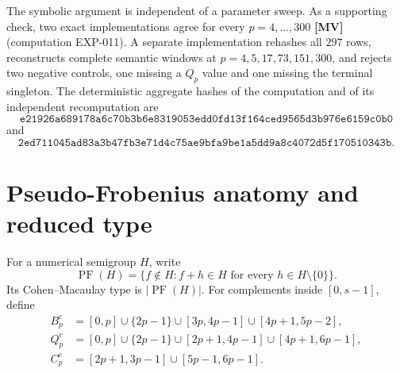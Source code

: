 \documentclass[11pt]{article}
\theoremstyle{definition}
\theoremstyle{remark}
\begin{document}
The symbolic argument is independent of a parameter sweep. As a supporting check, two exact
implementations agree for every $p=4,\ldots,300$ \textbf{[MV]} (computation EXP-011). A separate
implementation rehashes all $297$ rows, reconstructs complete semantic windows at
$p=4,5,17,73,151,300$, and rejects two negative controls, one missing a $Q_p$ value and one missing
the terminal singleton. The deterministic aggregate hashes of the computation and of its
independent recomputation are
\[
\texttt{e21926a689178a6c70b3b6e8319053edd0fd13f164ced9565d3b976e6159c0b0}
\]
and
\[
\texttt{2ed711045ad83a3b47fb3e71d4c75ae9bfa9be1a5dd9a8c4072d5f170510343b}.
\]

\section{Pseudo-Frobenius anatomy and reduced type}

For a numerical semigroup $H$, write
\[
\operatorname{PF}(H)=\{f\notin H:f+h\in H\text{ for every }h\in H\setminus\{0\}\}.
\]
Its Cohen--Macaulay type is $|\operatorname{PF}(H)|$. For complements inside $[0,s-1]$, define
\begin{align*}
B_p^c&=[0,p]\cup\{2p-1\}\cup[3p,4p-1]\cup[4p+1,5p-2],\\
Q_p^c&=[0,p]\cup\{2p-1\}\cup[2p+1,4p-1]\cup[4p+1,6p-1],\\
C_p^c&=[2p+1,3p-1]\cup[5p-1,6p-1].
\end{align*}
\end{document}
